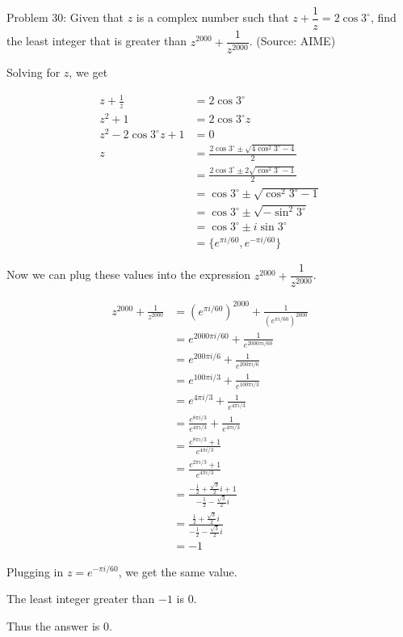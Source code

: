 Problem 30: Given that $z$ is a complex number such that $z + \dfrac{1}{z} = 2 \cos 3^\circ$, find the least integer that is greater than $z^{2000} + \dfrac{1}{z^{2000}}$. (Source: AIME)

Solving for $z$, we get

\begin{align*}
z + \frac{1}{z} &= 2 \cos 3^\circ \\
z^2 + 1 &= 2 \cos 3^\circ z \\
z^2 - 2 \cos 3^\circ z + 1 &= 0 \\
z &= \frac{2 \cos 3^\circ \pm \sqrt{4 \cos^2 3^\circ - 4}}{2} \\
&= \frac{2 \cos 3^\circ \pm 2\sqrt{\cos^2 3^\circ - 1}}{2} \\
&= \cos 3^\circ \pm \sqrt{\cos^2 3^\circ - 1} \\
&= \cos 3^\circ \pm \sqrt{-\sin^2 3^\circ } \\
&= \cos 3^\circ \pm i \sin 3^\circ \\
&= \{e^{\pi i / 60}, e^{-\pi i / 60}\}
\end{align*}

Now we can plug these values into the expression $z^{2000} + \dfrac{1}{z^{2000}}$.

\begin{align*}
z^{2000} + \frac{1}{z^{2000}} &= (e^{\pi i / 60})^{2000} + \frac{1}{(e^{\pi i / 60})^{2000}} \\
&= e^{2000 \pi i / 60} + \frac{1}{e^{2000 \pi i / 60}} \\
&= e^{200 \pi i / 6} + \frac{1}{e^{200 \pi i / 6}} \\
&= e^{100 \pi i / 3} + \frac{1}{e^{100 \pi i / 3}} \\
&= e^{4 \pi i / 3} + \frac{1}{e^{4 \pi i / 3}} \\
&= \frac{e^{8 \pi i / 3}}{e^{4 \pi i / 3}} + \frac{1}{e^{4 \pi i / 3}} \\
&= \frac{e^{8 \pi i / 3} + 1}{e^{4 \pi i / 3}} \\
&= \frac{e^{2 \pi i / 3} + 1}{e^{4 \pi i / 3}} \\
&= \frac{-\frac{1}{2} + \frac{\sqrt 3}{2}i + 1}{-\frac{1}{2} - \frac{\sqrt 3}{2}i} \\
&= \frac{\frac{1}{2} + \frac{\sqrt 3}{2}i}{-\frac{1}{2} - \frac{\sqrt 3}{2}i} \\
&= -1
\end{align*}

Plugging in $z = e^{-\pi i / 60}$, we get the same value.

The least integer greater than $\displaystyle -1$ is $\displaystyle 0$.

Thus the answer is $\boxed{0}$.
